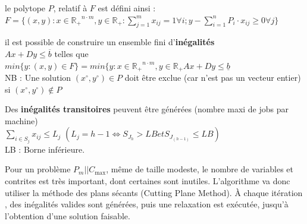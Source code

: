 \documentclass[a4paper,12pt]{report}
\theoremstyle{plain}				%
\theoremstyle{definition}				%
\newcommand\problemGraham{$P_m||C_{\max}$}
\begin{document}
\bigskip
le polytope $P$, relatif à $F$ est défini ainsi : \\
$F=\{ (x,y) : x \in \mathbb{R_+}^{n \cdot m}, y \in \mathbb{R_+} : \sum_{j=1}^{m} x_{ij}=1 \forall i;
y-\sum_{i=1}^{n} P_i \cdot x_{ij} \geq 0 \forall j	\}$

\bigskip
il est possible de construire un ensemble fini d'\textbf{inégalités} \\
$Ax+Dy \leq \overline{b}$ telles que \\
$min \{y : (x,y) \in F \} = min \{y : x \in \mathbb{R_+}^{n \cdot m}, y \in \mathbb{R_+} Ax+Dy \leq \underline{b}$ \\
NB : Une solution $(x \ensuremath{^\circ} , y\ensuremath{^\circ}) \in P$ doit être exclue (car n'est pas un vecteur entier) si $(x\ensuremath{^\circ}, y\ensuremath{^\circ}) \notin P $

\bigskip
Des \textbf{inégalités transitoires} peuvent être générées (nombre maxi de jobs par machine) \\
$\sum_{i \in S_j} x_{ij} \leq L_j$ \quad $(L_j = h-1 \iff S_{J_h} > LB et S_{J_{(h-1)}} \leq LB)$\\
LB : Borne inférieure.

\bigskip
Pour un problème \problemGraham, même de taille modeste, le nombre de variables et contrites est très important, dont certaines sont inutiles. L'algorithme va donc utiliser la méthode des plans sécants (Cutting Plane Method). \`A chaque itération , des inégalités valides sont générées, puis une relaxation est exécutée, jusqu'à l'obtention d'une solution faisable.
\end{document}
